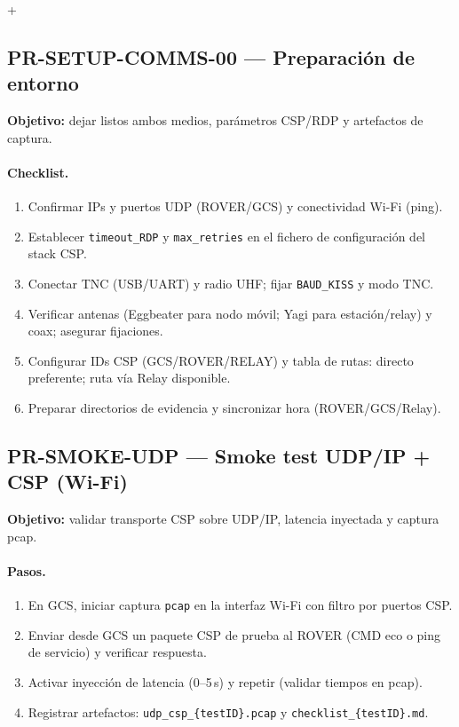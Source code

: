 +%
\subsection*{PR-SETUP-COMMS-00 — Preparación de entorno}
\textbf{Objetivo:} dejar listos ambos medios, parámetros CSP/RDP y artefactos de captura.

\paragraph{Checklist.}
\begin{enumerate}
  \item Confirmar IPs y puertos UDP (ROVER/GCS) y conectividad Wi-Fi (ping).
  \item Establecer \texttt{timeout\_RDP} y \texttt{max\_retries} en el fichero de configuración del stack CSP.
  \item Conectar TNC (USB/UART) y radio UHF; fijar \texttt{BAUD\_KISS} y modo TNC.
  \item Verificar antenas (Eggbeater para nodo móvil; Yagi para estación/relay) y coax; asegurar fijaciones.
  \item Configurar IDs CSP (GCS/ROVER/RELAY) y tabla de rutas: directo preferente; ruta vía Relay disponible.
  \item Preparar directorios de evidencia y sincronizar hora (ROVER/GCS/Relay).
\end{enumerate}

\subsection*{PR-SMOKE-UDP — Smoke test UDP/IP + CSP (Wi-Fi)}
\textbf{Objetivo:} validar transporte CSP sobre UDP/IP, latencia inyectada y captura pcap.

\paragraph{Pasos.}
\begin{enumerate}
  \item En GCS, iniciar captura \texttt{pcap} en la interfaz Wi-Fi con filtro por puertos CSP.
  \item Enviar desde GCS un paquete CSP de prueba al ROVER (CMD eco o ping de servicio) y verificar respuesta.
  \item Activar inyección de latencia (0–5\,s) y repetir (validar tiempos en pcap).
  \item Registrar artefactos: \texttt{udp\_csp\_\{testID\}.pcap} y \texttt{checklist\_\{testID\}.md}.
\end{enumerate}

